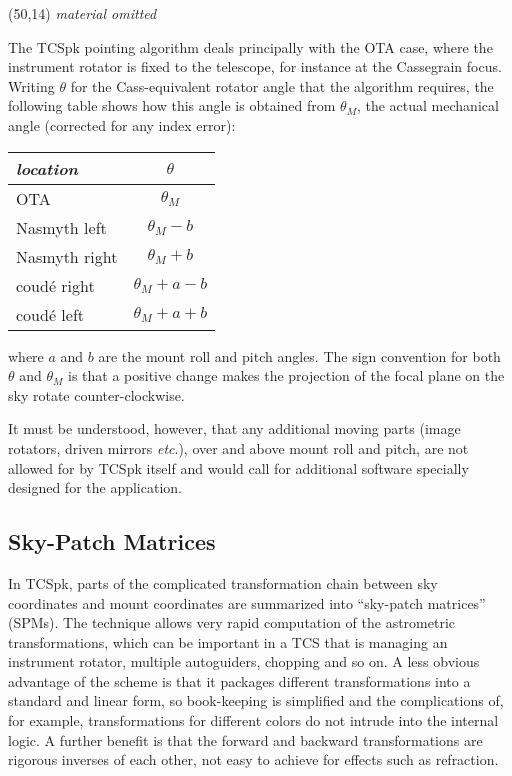 \documentclass[12pt,fleqn,twoside]{article}
\renewcommand{\_}{{\tt\char'137}}     %
\newcommand{\abridged}  {\vspace{3ex} \begin{center}
                        \framebox(50,14){\vspace*{1mm}
                        \large \it material omitted}
                        \end{center}\vspace{3ex}}
\begin{document}
\ifx\vdoc\vshort
\abridged
\else
The TCSpk pointing algorithm deals principally with the OTA case,
where the
instrument rotator is fixed to the telescope, for instance at the
Cassegrain focus. Writing $\theta$ for the Cass-equivalent rotator
angle that the algorithm requires, the following table shows how
this angle is obtained from $\theta_M$, the actual mechanical
angle (corrected for any index error):

\begin{center}
\begin{tabular}{|l|c|} \hline
{\it location} & $\theta$ \\
\hline
OTA & $\theta_M$ \\
Nasmyth left & $\theta_M - b$ \\
Nasmyth right & $\theta_M + b$ \\
coud\'{e} right & $\theta_M + a - b$ \\
coud\'{e} left & $\theta_M + a + b$ \\
\hline
\end{tabular}
\end{center}
where $a$ and $b$ are the mount roll and pitch angles. The sign
convention for both $\theta$ and $\theta_M$ is that a positive
change makes the projection of the focal plane on the sky rotate
counter-clockwise.

It must be understood, however, that any additional moving parts
(image rotators, driven mirrors {\it etc}.),
over and above mount roll and pitch,
are not allowed for by TCSpk itself and would call for additional
software specially designed for the application.
\fi

\subsection{Sky-Patch Matrices}
\label{SPMs}

In TCSpk, parts of the complicated transformation chain between
sky coordinates and mount coordinates are summarized into
``sky-patch matrices'' (SPMs).  The technique allows very rapid
computation of the astrometric transformations, which can be important
in a TCS that is managing an instrument rotator,
multiple autoguiders, chopping and
so on.  A less obvious advantage of the scheme is that it packages
different transformations into a standard and
linear form, so book-keeping is
simplified and the complications of, for example, transformations
for different colors
do not intrude into the internal logic. A
further benefit is that the forward and backward transformations
are rigorous inverses of each other, not easy to achieve for
effects such as refraction.
\end{document}
